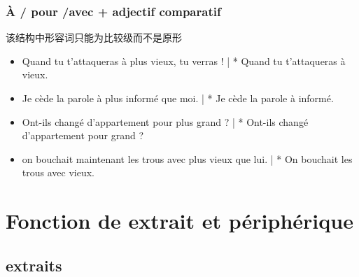 \documentclass[UTF8]{report}
\begin{document}
\subsubsection{À / pour /avec + adjectif comparatif}
该结构中形容词只能为比较级而不是原形
\begin{itemize}
    \item Quand tu t’attaqueras à plus vieux, tu verras ! | * Quand tu t’attaqueras à vieux.
    \item Je cède la parole à plus informé que moi. | * Je cède la parole à informé.
    \item Ont-ils changé d’appartement pour plus grand ? | * Ont-ils changé d’appartement pour grand ?
    \item on bouchait maintenant les trous avec plus vieux que lui. | * On bouchait les trous avec vieux.
\end{itemize}

\section{Fonction de extrait et périphérique}
\subsection{extraits}
\end{document}
